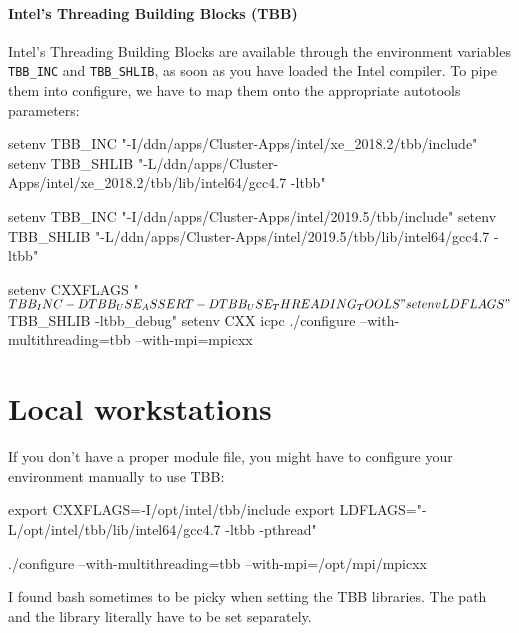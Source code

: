 \paragraph{Intel's Threading Building Blocks (TBB)}

Intel's Threading Building Blocks are available through the environment
variables \texttt{TBB\_INC} and \texttt{TBB\_SHLIB}, as soon as you have 
loaded the Intel compiler.
To pipe them into configure, we have to map them onto the appropriate autotools
parameters:

\begin{code}
 setenv TBB_INC "-I/ddn/apps/Cluster-Apps/intel/xe_2018.2/tbb/include"
 setenv TBB_SHLIB "-L/ddn/apps/Cluster-Apps/intel/xe_2018.2/tbb/lib/intel64/gcc4.7 -ltbb"
 
 setenv TBB_INC "-I/ddn/apps/Cluster-Apps/intel/2019.5/tbb/include"
 setenv TBB_SHLIB "-L/ddn/apps/Cluster-Apps/intel/2019.5/tbb/lib/intel64/gcc4.7 -ltbb"
 
 setenv CXXFLAGS "$TBB_INC  -DTBB_USE_ASSERT -DTBB_USE_THREADING_TOOLS"
 setenv LDFLAGS "$TBB_SHLIB -ltbb_debug"
 setenv CXX icpc
 ./configure --with-multithreading=tbb --with-mpi=mpicxx
\end{code}



\section{Local workstations}
If you don't have a proper module file, you might have to configure your environment manually to use TBB:
\begin{code}
export CXXFLAGS=-I/opt/intel/tbb/include
export LDFLAGS="-L/opt/intel/tbb/lib/intel64/gcc4.7 -ltbb -pthread"

./configure --with-multithreading=tbb --with-mpi=/opt/mpi/mpicxx
\end{code}

I found bash sometimes to be picky when setting the TBB libraries. The path and the library literally have to be set separately.






